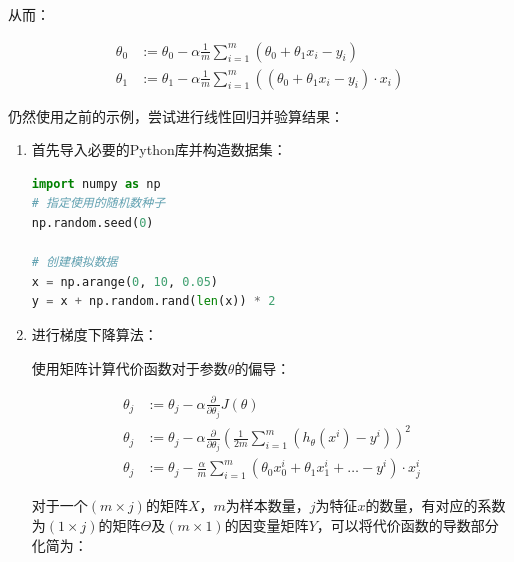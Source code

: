 \documentclass[12pt, a4paper]{article}
\begin{document}
从而：

\begin{align*}
    \theta_0 & :=\theta_0-\alpha\frac{1}{m}\sum_{i=1}^{m}(\theta_0+\theta_1x_i-y_i)            \\
    \theta_1 & :=\theta_1-\alpha\frac{1}{m}\sum_{i=1}^{m}((\theta_0+\theta_1x_i-y_i)\cdot x_i)
\end{align*}

仍然使用之前的示例，尝试进行线性回归并验算结果：

\begin{enumerate}
    \item
          首先导入必要的Python库并构造数据集：

          \begin{lstlisting}[language=Python]
import numpy as np
# 指定使用的随机数种子
np.random.seed(0)

# 创建模拟数据
x = np.arange(0, 10, 0.05)
y = x + np.random.rand(len(x)) * 2
               \end{lstlisting}

    \item
          进行梯度下降算法：

          使用矩阵计算代价函数对于参数$\theta$的偏导：

          \begin{align*}
              \theta_j & :=\theta_j-\alpha\frac{\partial}{\partial\theta_j}J(\theta)                                         \\
              \theta_j & :=\theta_j-\alpha\frac{\partial}{\partial\theta_j}(\frac{1}{2m}\sum_{i=1}^{m}(h_\theta(x^i)-y^i))^2 \\
              \theta_j & :=\theta_j-\frac{\alpha}{m}\sum_{i=1}^{m}(\theta_0x_0^i+\theta_1x_1^i+\dots-y^i)\cdot x_j^i
          \end{align*}

          对于一个$(m\times j)$的矩阵$X$，$m$为样本数量，$j$为特征$x$的数量，有对应的系数为$(1\times j)$的矩阵$\Theta$及$(m\times 1)$的因变量矩阵$Y$，可以将代价函数的导数部分化简为：


\end{enumerate}
\end{document}
